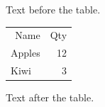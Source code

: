 \documentclass[12pt]{article}
\begin{document}
Text before the table.

\begin{tabular}{lr}\multicolumn{1}{r}{Name} & \multicolumn{1}{l}{Qty}\\Apples & 12\\Kiwi & 3\end{tabular}

Text after the table.
\end{document}
